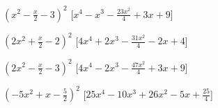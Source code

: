 \begin{esercizio}
\begin{enumeratea}
\item \(\left(x^{2} - \frac{x}{2} - 3\right)^{2}\)
  \hfill [\(x^{4} - x^{3} - \frac{23 x^{2}}{4} + 3 x + 9\)]
\item \(\left(2 x^{2} + \frac{x}{2} - 2\right)^{2}\)
  \hfill [\(4 x^{4} + 2 x^{3} - \frac{31 x^{2}}{4} - 2 x + 4\)]
\item \(\left(2 x^{2} - \frac{x}{2} - 3\right)^{2}\)
  \hfill [\(4 x^{4} - 2 x^{3} - \frac{47 x^{2}}{4} + 3 x + 9\)]
\item \(\left(- 5 x^{2} + x - \frac{5}{2}\right)^{2}\)
  \hfill [\(25 x^{4} - 10 x^{3} + 26 x^{2} - 5 x + \frac{25}{4}\)]

\end{enumeratea}
\end{esercizio}
